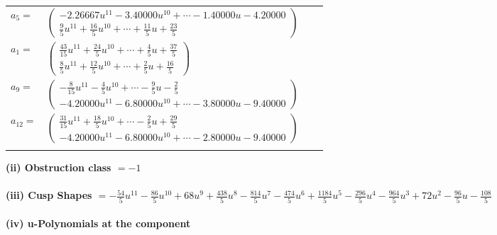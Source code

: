 \documentclass[1p]{elsarticle_modified}
\theoremstyle{definition}
\begin{document}
\begin{tabular}{m{7pt} m{180pt} m{7pt} m{180pt} }
\flushright $a_{5}=$&$\begin{pmatrix}-2.26667 u^{11}-3.40000 u^{10}+\cdots-1.40000 u-4.20000\\\frac{9}{5} u^{11}+\frac{16}{5} u^{10}+\cdots+\frac{11}{5} u+\frac{23}{5}\end{pmatrix}$ \\
\flushright $a_{1}=$&$\begin{pmatrix}\frac{43}{15} u^{11}+\frac{24}{5} u^{10}+\cdots+\frac{4}{5} u+\frac{37}{5}\\\frac{8}{5} u^{11}+\frac{12}{5} u^{10}+\cdots+\frac{2}{5} u+\frac{16}{5}\end{pmatrix}$ \\
\flushright $a_{9}=$&$\begin{pmatrix}-\frac{8}{15} u^{11}-\frac{4}{5} u^{10}+\cdots-\frac{9}{5} u-\frac{2}{5}\\-4.20000 u^{11}-6.80000 u^{10}+\cdots-3.80000 u-9.40000\end{pmatrix}$ \\
\flushright $a_{12}=$&$\begin{pmatrix}\frac{31}{15} u^{11}+\frac{18}{5} u^{10}+\cdots-\frac{2}{5} u+\frac{29}{5}\\-4.20000 u^{11}-6.80000 u^{10}+\cdots-2.80000 u-9.40000\end{pmatrix}$\\&\end{tabular}
\flushleft \textbf{(ii) Obstruction class $= -1$}\\~\\
\flushleft \textbf{(iii) Cusp Shapes $= -\frac{54}{5} u^{11}-\frac{86}{5} u^{10}+68 u^9+\frac{438}{5} u^8-\frac{814}{5} u^7-\frac{474}{5} u^6+\frac{1184}{5} u^5-\frac{296}{5} u^4-\frac{964}{5} u^3+72 u^2-\frac{96}{5} u-\frac{108}{5}$}\\~\\
\newpage\renewcommand{\arraystretch}{1}
\flushleft \textbf{(iv) u-Polynomials at the component}\newline \\
\end{document}
